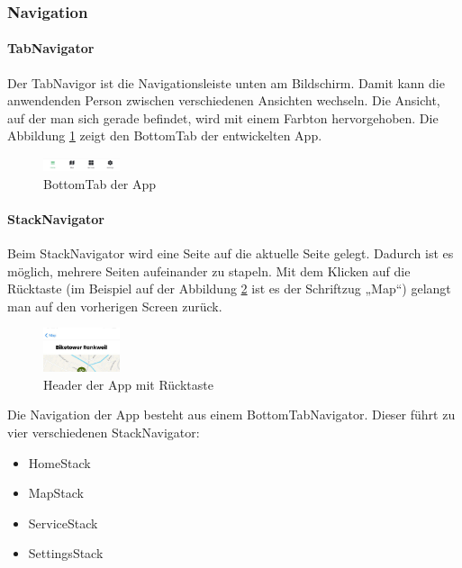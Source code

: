 \subsubsection{Navigation}
\paragraph{TabNavigator} Der TabNavigor ist die Navigationsleiste unten am Bildschirm. Damit kann die anwendenden Person zwischen verschiedenen Ansichten wechseln. Die Ansicht, auf der man sich gerade befindet, wird mit einem Farbton hervorgehoben. Die Abbildung \ref{fig:bottomtab} zeigt den BottomTab der entwickelten App. \cite{tabnavigator} \\
\begin{figure}[H]
    \centering
    \includegraphics[width=0.2\textwidth]{images/tab.png}
    \caption{BottomTab der App}
    \label{fig:bottomtab}
  \end{figure}

\paragraph{StackNavigator}Beim StackNavigator wird eine Seite auf die aktuelle Seite gelegt. Dadurch ist es möglich, mehrere Seiten aufeinander zu stapeln. Mit dem Klicken auf die Rücktaste (im Beispiel auf der Abbildung \ref{fig:appheader} ist es der Schriftzug „Map“) gelangt man auf den vorherigen Screen zurück. \cite{stacknavigator} \\
\begin{figure}[H]
    \centering
    \includegraphics[width=0.2\textwidth]{images/appheader.png}
    \caption{Header der App mit Rücktaste}
    \label{fig:appheader}
\end{figure}


Die Navigation der App besteht aus einem BottomTabNavigator. Dieser führt zu vier verschiedenen StackNavigator:\\
\begin{itemize}
    \item HomeStack
    \item MapStack
    \item ServiceStack 
    \item SettingsStack
\end{itemize}

